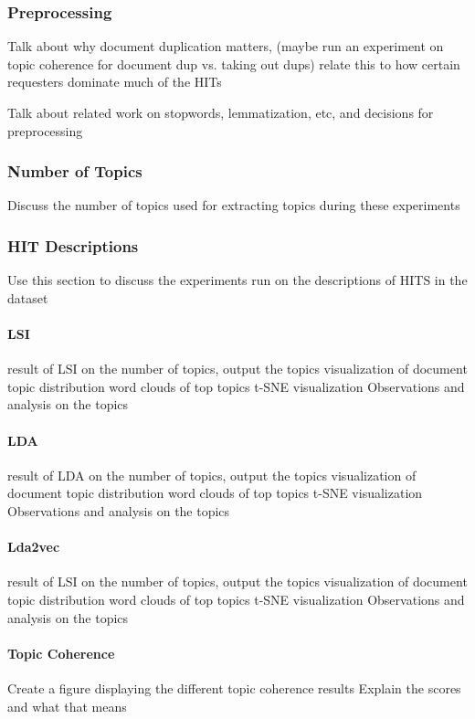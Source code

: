 \documentclass[letterpaper,12pt]{article}
\begin{document}
\subsubsection{Preprocessing}
Talk about why document duplication matters,
(maybe run an experiment on topic coherence for document dup vs. taking out dups) relate this to
how certain requesters dominate much of the HITs

Talk about related work on stopwords, lemmatization, etc, and decisions for preprocessing

\subsubsection{Number of Topics}
Discuss the number of topics used for extracting topics during these experiments

\subsubsection{HIT Descriptions}
Use this section to discuss the experiments run on the descriptions of HITS in the dataset

\paragraph{LSI}
result of LSI on the number of topics, output the topics
visualization of document topic distribution
word clouds of top topics
t-SNE visualization
Observations and analysis on the topics

\paragraph{LDA}
result of LDA on the number of topics, output the topics
visualization of document topic distribution
word clouds of top topics
t-SNE visualization
Observations and analysis on the topics

\paragraph{Lda2vec}
result of LSI on the number of topics, output the topics
visualization of document topic distribution
word clouds of top topics
t-SNE visualization
Observations and analysis on the topics

\paragraph{Topic Coherence}
Create a figure displaying the different topic coherence results
Explain the scores and what that means
\end{document}
